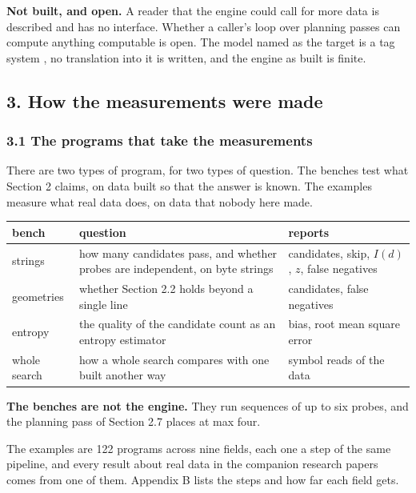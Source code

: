 \noindent\textbf{Not built, and open.} A reader that the engine could call for more data is described and has no interface. Whether a caller's loop over planning passes can compute anything computable is open. The model named as the target is a tag system \cite{src:Post, src:Minsky}, no translation into it is written, and the engine as built is finite.

\subsection{3. How the measurements were made}

\subsubsection{3.1 The programs that take the measurements}

There are two types of program, for two types of question. The benches test what Section 2
claims, on data built so that the answer is known. The examples measure what real data does, on
data that nobody here made.

\begin{center}
\begin{tabular}{@{}>{\raggedright\arraybackslash}p{}>{\raggedright\arraybackslash}p{}>{\raggedright\arraybackslash}p{}@{}}
\toprule
bench & question & reports \\
\midrule
strings &
  how many candidates pass, and whether probes are independent, on byte strings &
  candidates, skip, \(I(d)\), \(z\), false negatives \\
\addlinespace[0.4em]
geometries &
  whether Section 2.2 holds beyond a single line &
  candidates, false negatives \\
\addlinespace[0.4em]
entropy &
  the quality of the candidate count as an entropy estimator &
  bias, root mean square error \\
\addlinespace[0.4em]
whole search &
  how a whole search compares with one built another way &
  symbol reads of the data \\
\bottomrule
\end{tabular}
\end{center}

\noindent\textbf{The benches are not the engine.} They run sequences of up to six probes, and the planning pass of Section 2.7 places at max four.

The examples are 122 programs across nine fields, each one a step of the same pipeline, and every result about real data in the companion research papers comes from one of them. Appendix B lists the steps and how far each field gets.

